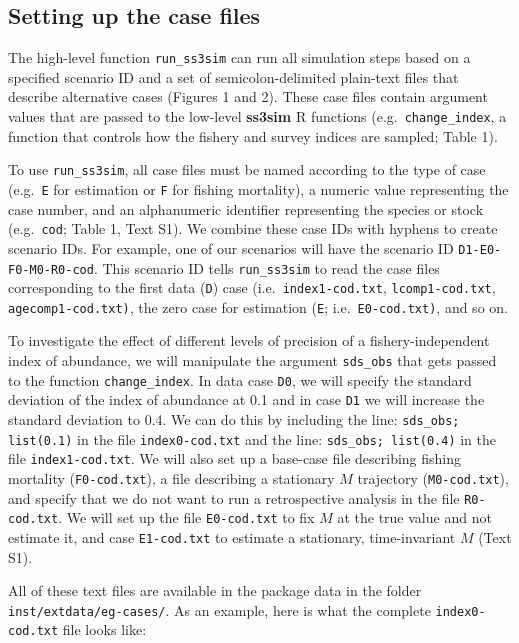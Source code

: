 \documentclass[10pt]{article}
\newcommand{\R}[1]{\label{#1}\linelabel{#1}}
\begin{document}
\subsection*{Setting up the case files}

The high-level function \texttt{run\_ss3sim} can run all simulation steps based
on a specified scenario ID and a set of semicolon-delimited plain-text files
that describe alternative cases \R{B21:2}(Figures 1 and 2). These case files
contain argument values that are passed to the low-level \textbf{ss3sim}
\textsf{R} functions (e.g.~\texttt{change\_index}, a function that controls how
the fishery and survey indices are sampled; Table 1).

To use \texttt{run\_ss3sim}, all case files must be named according to the type
of case (e.g.~\texttt{E} for estimation or \texttt{F} for fishing mortality), a
numeric value representing the case number, and an alphanumeric identifier
representing the species or stock (e.g.~\texttt{cod}; Table 1, Text S1). We
combine these case IDs with hyphens to create scenario IDs. For example, one of
our scenarios will have the scenario ID \texttt{D1-E0-F0-M0-R0-cod}. This
scenario ID tells \texttt{run\_ss3sim} to read the case files corresponding to
the first data (\texttt{D}) case (i.e.~\texttt{index1-cod.txt},
\texttt{lcomp1-cod.txt}, \texttt{agecomp1-cod.txt)}, the zero case for
estimation (\texttt{E}; i.e.~\texttt{E0-cod.txt)}, and so on.

To investigate the effect of different levels of precision of a
fishery-independent index of abundance, we will manipulate the argument
\texttt{sds\_obs} that gets passed to the function \texttt{change\_index}. In
data case \texttt{D0}, we will specify the standard deviation of the index of
abundance at 0.1 and in case \texttt{D1} we will increase the standard
deviation to 0.4. We can do this by including the line: \texttt{sds\_obs;
  list(0.1)} in the file \texttt{index0-cod.txt} and the line:
\texttt{sds\_obs; list(0.4)} in the file \texttt{index1-cod.txt}. We will also
set up a base-case file describing fishing mortality (\texttt{F0-cod.txt}), a
file describing a stationary $M$ trajectory (\texttt{M0-cod.txt}), and specify
that we do not want to run a retrospective analysis in the file
\texttt{R0-cod.txt}. We will set up the file \texttt{E0-cod.txt} to fix $M$ at
the true value and not estimate it, and case \texttt{E1-cod.txt} to estimate a
stationary, time-invariant $M$ (Text S1).

All of these text files are available in the package data in the folder
\texttt{inst/extdata/eg-cases/}. As an example, here is what the complete
\texttt{index0-cod.txt} file looks like:
\end{document}
